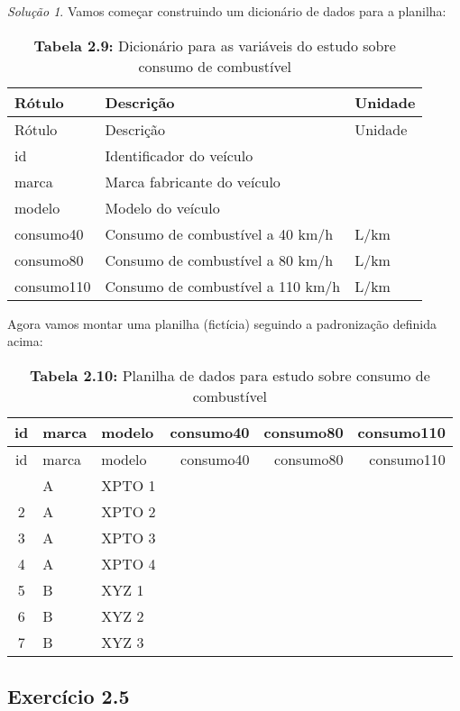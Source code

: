\documentclass[
]{latex/krantz}
\theoremstyle{definition}
\theoremstyle{definition}
\theoremstyle{definition}
\theoremstyle{definition}
\theoremstyle{remark}
\newtheorem*{solution}{Solução}
\begin{document}
\begin{solution}

Vamos começar construindo um dicionário de dados para a planilha:

\begin{longtable}[]{@{}lll@{}}
\caption{\textbf{Tabela 2.9:} Dicionário para as variáveis do estudo sobre consumo de combustível}\tabularnewline
\toprule\noalign{}
Rótulo & Descrição & Unidade \\
\midrule\noalign{}
\endfirsthead
\toprule\noalign{}
Rótulo & Descrição & Unidade \\
\midrule\noalign{}
\endhead
\bottomrule\noalign{}
\endlastfoot
id & Identificador do veículo & \\
marca & Marca fabricante do veículo & \\
modelo & Modelo do veículo & \\
consumo40 & Consumo de combustível a 40 km/h & L/km \\
consumo80 & Consumo de combustível a 80 km/h & L/km \\
consumo110 & Consumo de combustível a 110 km/h & L/km \\
\end{longtable}

Agora vamos montar uma planilha (fictícia) seguindo a padronização definida acima:

\begin{longtable}[]{@{}cllrrr@{}}
\caption{\textbf{Tabela 2.10:} Planilha de dados para estudo sobre consumo de combustível}\tabularnewline
\toprule\noalign{}
id & marca & modelo & consumo40 & consumo80 & consumo110 \\
\midrule\noalign{}
\endfirsthead
\toprule\noalign{}
id & marca & modelo & consumo40 & consumo80 & consumo110 \\
\midrule\noalign{}
\endhead
\bottomrule\noalign{}
\endlastfoot
1 & A & XPTO 1 & & & \\
2 & A & XPTO 2 & & & \\
3 & A & XPTO 3 & & & \\
4 & A & XPTO 4 & & & \\
5 & B & XYZ 1 & & & \\
6 & B & XYZ 2 & & & \\
7 & B & XYZ 3 & & & \\
\end{longtable}

\end{solution}

\hypertarget{exr2-5}{%
\subsection*{Exercício 2.5}\label{exr2-5}}
\end{document}
